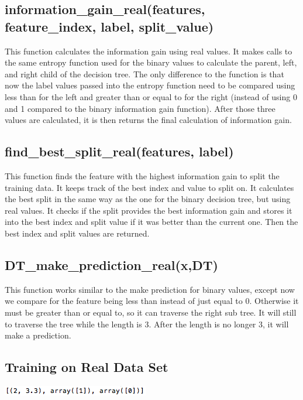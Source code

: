 \documentclass{article}
\begin{document}
\subsection{information\_gain\_real(features, feature\_index, label, split\_value)}
This function calculates the information gain using real values. It makes calls to the same entropy function used for the binary values to calculate the parent, left, and right child of the decision tree. The only difference to the function is that now the label values passed into the entropy function need to be compared using less than for the left and greater than or equal to for the right (instead of using 0 and 1 compared to the binary information gain function). After those three values are calculated, it is then returns the final calculation of information gain. 

\subsection{find\_best\_split\_real(features, label)}
This function finds the feature with the highest information gain to split the training data. It keeps track of the best index and value to split on. It calculates the best split in the same way as the one for the binary decision tree, but using real values. It checks if the split provides the best information gain and stores it into the best index and split value if it was better than the current one. Then the best index and split values are returned. 

\subsection{DT\_make\_prediction\_real(x,DT)}
This function works similar to the make prediction for binary values, except now we compare for the feature being less than instead of just equal to 0. Otherwise it must be greater than or equal to, so it can traverse the right sub tree. It will still to traverse the tree while the length is 3. After the length is no longer 3, it will make a prediction. 

\subsection{Training on Real Data Set}
\includegraphics[]{Real_Decision_Tree.png}
\end{document}
